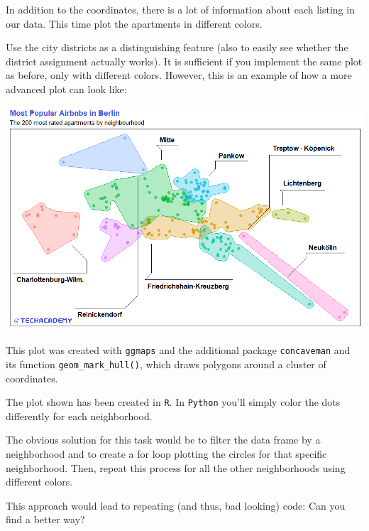 \documentclass[
  11pt,
]{book}
\newenvironment{tips}[1]
  {
  \begin{itemize}
  \footnotesize
  \renewcommand{\labelitemi}{
    \raisebox{-.7\height}[0pt][0pt]{
      {\setkeys{Gin}{width=3em,keepaspectratio}
        \texttt{[image: images/\#1.png]}}
    }
  }
  \setlength{\fboxsep}{1em}
  \begin{rbox}
  \item
  }
  {
  \end{rbox}
  \end{itemize}
  }
\newenvironment{tipsp}[1]
  {
  \begin{itemize}
  \footnotesize
  \renewcommand{\labelitemi}{
    \raisebox{-.7\height}[0pt][0pt]{
      {\setkeys{Gin}{width=3em,keepaspectratio}
        \texttt{[image: images/\#1.png]}}
    }
  }
  \setlength{\fboxsep}{1em}
  \begin{pbox}
  \item
  }
  {
  \end{pbox}
  \end{itemize}
  }
\begin{document}
In addition to the coordinates, there is a lot of information about each listing in our data. This time plot the apartments in different colors.

Use the city districts as a distinguishing feature (also to easily see whether the district assignment actually works). It is sufficient if you implement the same plot as before, only with different colors. However, this is an example of how a more advanced plot can look like:

\begin{center}\includegraphics[width=1\linewidth]{plot/4_2_map_top200_by_neighbourhood} \end{center}

\begin{tips}r

This plot was created with \texttt{ggmaps} and the additional package \texttt{concaveman} and its function \texttt{geom\_mark\_hull()}, which draws polygons around a cluster of coordinates.

\end{tips}

\begin{tipsp}p

The plot shown has been created in \texttt{R}. In \texttt{Python} you'll simply color the dots differently for each neighborhood.

The obvious solution for this task would be to filter the data frame by a neighborhood and to create a for loop plotting the circles for that specific neighborhood. Then, repeat this process for all the other neighborhoods using different colors.

This approach would lead to repeating (and thus, bad looking) code: Can you find a better way?

\end{tipsp}
\end{document}
